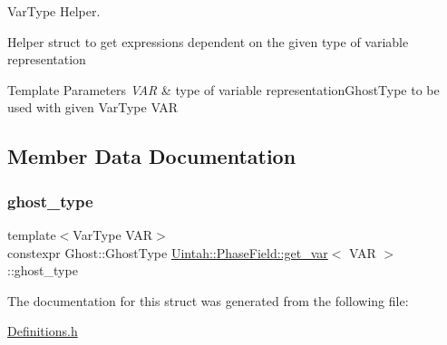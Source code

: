 Var\+Type Helper. 

Helper struct to get expressions dependent on the given type of variable representation 
\begin{DoxyTemplParams}{Template Parameters}
{\em V\+AR} & type of variable representation\+Ghost\+Type to be used with given Var\+Type V\+AR \\
\hline
\end{DoxyTemplParams}


\subsection{Member Data Documentation}
\mbox{\label{structUintah_1_1PhaseField_1_1get__var_a3896c2551eea0e63cd6315a6cff02bfd}} 
\subsubsection{\texorpdfstring{ghost\+\_\+type}{ghost\_type}}
{\footnotesize\ttfamily template$<$Var\+Type V\+AR$>$ \\
constexpr Ghost\+::\+Ghost\+Type \hyperlink{structUintah_1_1PhaseField_1_1get__var}{Uintah\+::\+Phase\+Field\+::get\+\_\+var}$<$ V\+AR $>$\+::ghost\+\_\+type\hspace{0.3cm}{\ttfamily [static]}}



The documentation for this struct was generated from the following file\+:\begin{DoxyCompactItemize}
\item 
\hyperlink{Definitions_8h}{Definitions.\+h}\end{DoxyCompactItemize}

